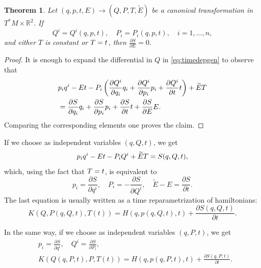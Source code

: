 \documentclass[english,fontsize=11pt,paper=a5,oneside]{scrbook}
\newcommand{\R}{\mathbb{R}}
\let\d\relax
\DeclareMathOperator{\d}{d}
\newtheorem{theorem}{Theorem}[chapter]
\theoremstyle{definition}
\begin{document}
\begin{theorem}\label{thm:Ham0}
    Let $(q,p,t,E) \to (Q,P,T,\widetilde E)$ be a canonical transformation in $T^*M\times \R^2$. If
    \begin{equation}
        Q^i = Q^i(q,p,t), \quad P_i = P_i(q,p,t), \quad i=1,\ldots,n,
    \end{equation}
    and either $T$ is constant or $\d T = \d t$, then $\frac{\partial S}{\partial E} = 0$.
\end{theorem}
\begin{proof}
    It is enough to expand the differential in $Q$ in \eqref{eq:timedepgen} to observe that
    \begin{align}
        &p_i \d q^i -E \d t - P_i \left(
            \frac{\partial Q^i}{\partial q_i}\d q_i
            +\frac{\partial Q^i}{\partial p_i}\d p_i
            +\frac{\partial Q^i}{\partial t}\d t
            \right) + \widetilde E \d T \\
        &= 
            \frac{\partial S}{\partial q_i}\d q_i
            +\frac{\partial S}{\partial p_i}\d p_i
            +\frac{\partial S}{\partial t}\d t
            +\frac{\partial S}{\partial E}\d E.
    \end{align}
    Comparing the corresponding elements one proves the claim.
\end{proof}

If we choose as independent variables $(q,Q,t)$, we get
\begin{equation}
    p_i \d q^i - E \d t -P_i \d Q^i + \widetilde E\d T = \d S(q,Q,t),
\end{equation}
which, using the fact that $\d T = \d t$, is equivalent to
\begin{equation}\label{eq:motionpPEtE}
    p_i = \frac{\partial S}{\partial q^i}, \quad
    P_i = - \frac{\partial S}{\partial Q^i}, \quad
    \widetilde E - E = \frac{\partial S}{\partial t}.
\end{equation}
The last equation is usually written as a time reparametrization of hamiltonians:
\begin{equation}\label{eq:time-reparamqQt}
    K(Q, P(q,Q,t), T(t)) = H(q,p(q,Q,t),t) + \frac{\partial S(q,Q,t)}{\partial t}.
\end{equation}

In the same way, if we choose as independent variables $(q,P,t)$, we get
\begin{align}
    &p_i = \frac{\partial S}{\partial q^i}, \quad Q^i = \frac{\partial S}{\partial P_i},\\
    &K(Q(q,P,t), P, T(t)) = H(q, p(q,P,t),t) + \frac{\partial S(q,P,t)}{\partial t}.\label{eq:time-reparamqPt}
\end{align}
\end{document}
